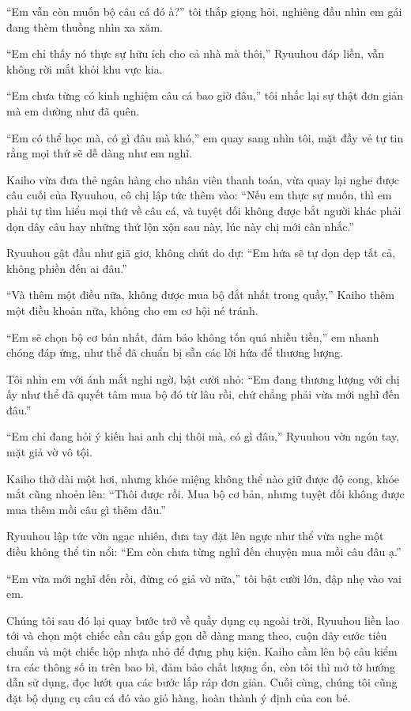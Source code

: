 ﻿\documentclass[../main.tex]{subfiles}
\begin{document}
``Em vẫn còn muốn bộ câu cá đó à?'' tôi thấp giọng hỏi, nghiêng đầu nhìn em gái đang thèm thuồng nhìn xa xăm.

``Em chỉ thấy nó thực sự hữu ích cho cả nhà mà thôi,'' Ryuuhou đáp liền, vẫn không rời mắt khỏi khu vực kia.

``Em chưa từng có kinh nghiệm câu cá bao giờ đâu,'' tôi nhắc lại sự thật đơn giản mà em dường như đã quên.

``Em có thể học mà, có gì đâu mà khó,'' em quay sang nhìn tôi, mặt đầy vẻ tự tin rằng mọi thứ sẽ dễ dàng như em nghĩ.

Kaiho vừa đưa thẻ ngân hàng cho nhân viên thanh toán, vừa quay lại nghe được câu cuối của Ryuuhou, cô chị lập tức thêm vào: ``Nếu em thực sự muốn, thì em phải tự tìm hiểu mọi thứ về câu cá, và tuyệt đối không được bắt người khác phải dọn dây câu hay những thứ lộn xộn sau này, lúc này chị mới cân nhắc.''

Ryuuhou gật đầu như giã giơ, không chút do dự: ``Em hứa sẽ tự dọn dẹp tất cả, không phiền đến ai đâu.''

``Và thêm một điều nữa, không được mua bộ đắt nhất trong quầy,'' Kaiho thêm một điều khoản nữa, không cho em cơ hội né tránh.

``Em sẽ chọn bộ cơ bản nhất, đảm bảo không tốn quá nhiều tiền,'' em nhanh chóng đáp ứng, như thể đã chuẩn bị sẵn các lời hứa để thương lượng.

Tôi nhìn em với ánh mắt nghi ngờ, bật cười nhỏ: ``Em đang thương lượng với chị ấy như thể đã quyết tâm mua bộ đó từ lâu rồi, chứ chẳng phải vừa mới nghĩ đến đâu.''

``Em chỉ đang hỏi ý kiến hai anh chị thôi mà, có gì đâu,'' Ryuuhou vờn ngón tay, mặt giả vờ vô tội.

Kaiho thở dài một hơi, nhưng khóe miệng không thể nào giữ được độ cong, khóe mắt cũng nhoẻn lên: ``Thôi được rồi. Mua bộ cơ bản, nhưng tuyệt đối không được mua thêm mồi câu gì thêm đâu.''

Ryuuhou lập tức vờn ngạc nhiên, đưa tay đặt lên ngực như thể vừa nghe một điều không thể tin nổi: ``Em còn chưa từng nghĩ đến chuyện mua mồi câu đâu ạ.''

``Em vừa mới nghĩ đến rồi, đừng có giả vờ nữa,'' tôi bật cười lớn, đập nhẹ vào vai em.

Chúng tôi sau đó lại quay bước trở về quầy dụng cụ ngoài trời, Ryuuhou liền lao tới và chọn một chiếc cần câu gấp gọn dễ dàng mang theo, cuộn dây cước tiêu chuẩn và một chiếc hộp nhựa nhỏ để đựng phụ kiện. Kaiho cầm lên bộ câu kiểm tra các thông số in trên bao bì, đảm bảo chất lượng ổn, còn tôi thì mở tờ hướng dẫn sử dụng, đọc lướt qua các bước lắp ráp đơn giản. Cuối cùng, chúng tôi cũng đặt bộ dụng cụ câu cá đó vào giỏ hàng, hoàn thành ý định của con bé.
\end{document}
